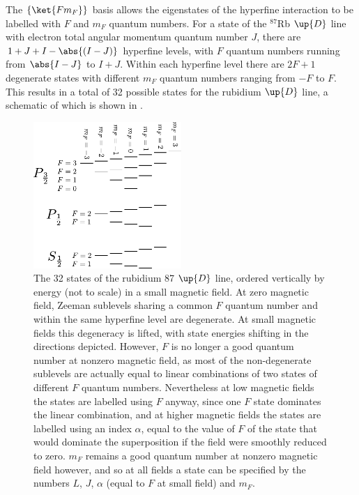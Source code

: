 The $\{\ket{F m_F}\}$ basis allows the eigenstates of the hyperfine interaction to be labelled with $F$ and $m_F$ quantum numbers. For a state of the $^{87}$Rb $\up{D}$ line with electron total angular momentum quantum number $J$, there are $1+J+I - \abs{(I - J)}$ hyperfine levels, with $F$ quantum numbers running from $\abs{I - J}$ to $I + J$. Within each hyperfine level there are $2F + 1$ degenerate states with different $m_F$ quantum numbers ranging from $-F$ to $F$. This results in a total of 32 possible states for the rubidium $\up{D}$ line, a schematic of which is shown in .

\begin{figure}%
\begin{center}
\includegraphics[width=0.5\textwidth]{figures/atomic_physics/D_line.pdf}
\caption{The 32 states of the rubidium 87 $\up{D}$ line, ordered vertically by energy (not to scale) in a small magnetic field. At zero magnetic field, Zeeman sublevels sharing a common $F$ quantum number and within the same hyperfine level are degenerate. At small magnetic fields this degeneracy is lifted, with state energies shifting in the directions depicted. However, $F$ is no longer a good quantum number at nonzero magnetic field, as most of the non-degenerate sublevels are actually equal to linear combinations of two states of different $F$ quantum numbers. Nevertheless at low magnetic fields the states are labelled using $F$ anyway, since one $F$ state dominates the linear combination, and at higher magnetic fields the states are labelled using an index $\alpha$, equal to the value of $F$ of the state that would dominate the superposition if the field were smoothly reduced to zero. $m_F$ remains a good quantum number at nonzero magnetic field however, and so at all fields a state can be specified by the numbers $L$, $J$, $\alpha$ (equal to $F$ at small field) and $m_F$.} \label{fig:D_line}
\end{center}
\end{figure}

